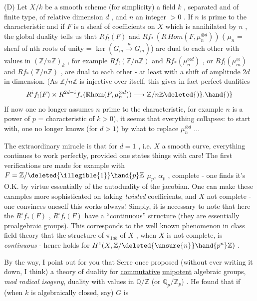 
(D) Let $X/k$ be a smooth scheme (for simplicity)  a field $k$ , separated
and of finite type, of relative dimension $d$ , and $n$ an integer $>0$ .
If $n$ is prime to the characteristic and if $F$ is a sheaf of coefficients
on $X$ which is annihilated by $n$ , the global duality tells us that $Rf_!(F)$
and $Rf_*\,(R\,\mathit{Hom}(F,\mu_n^{\otimes d}))$ ( $\mu_n$ = sheaf of nth roots of unity = $\ker(G_m \xrightarrow{n} G_m)$)
are dual to each other with values in $(\mathbb{Z}/n\mathbb{Z})_k$ , for example $Rf_!(\mathbb{Z}/n\mathbb{Z})$
and $Rf_*(\mu_n^{\otimes d})$ , or $Rf_!(\mu_m^{\otimes})$ and $Rf_*(\mathbb{Z}/n\mathbb{Z})$ , are dual to each other - at
least with a shift of amplitude $2d$ in dimension. (As $\mathbb{Z}/n\mathbb{Z}$ is injective
over itself, this gives in fact perfect dualities
\[ R^if_!(F) \times R^{2d-i}f_*(\mathbb{R}\mathrm{hom}(F, \mu_n^{\otimes d})) \longrightarrow \mathbb{Z}/n\mathbb{Z}\deleted{)}. \hand{)} \]
If now one no longer assumes $n$ prime to the characteristic, for example $n$
is a power of $p$ = characteristic of $k > 0$), it seems that everything
collapses: to start with, one no longer knows (for $d > 1$) by what to replace
$\mu_n^{\otimes d}$ ...

The extraordinary miracle is that for $d = 1$ , i.e. $X$ a smooth curve,
everything continues to work perfectly, provided one states things with care!
The first verifications are made for example with $F = \mathbb{Z}/\deleted{\illegible{1}}\hand{p}\mathbb{Z}$\hand{,} $\mu_p$,  $\alpha_p$ , 
complete - one finds it's O.K. by virtue essentially of the autoduality
of the jacobian. One can make these examples more sophisticated on taking
\textit{twisted} coefficients, and $X$ not complete - one convinces oneself this works
always! Simply, it is necessary to note that here the $R^if_*(F)$ , $R^if_!(F)$
have a ``continuous'' structure (they are essentially proalgebraic groups).
This corresponds to the well known phenomenon in class field theory that the
structure of $\pi_{1ab}$ of $X$ , when $X$ is not complete, is \textit{continuous} - hence
 holds for $H^1(X, \mathbb{Z}/\deleted{\unsure{n}}\hand{p^n}\mathbb{Z})$ .

By the way, I point out for you that Serre once proposed (without ever
writing it down, I think) a theory of duality for \uline{commutative} \uline{unipotent}
algebraic groups, \textit{mod radical isogeny}, duality with values in $\mathbb{Q}/\mathbb{Z}$ (or
$\mathbb{Q}_p/\mathbb{Z}_p$) . He found that if (when $k$ is algebraically closed, say) $G$ is

